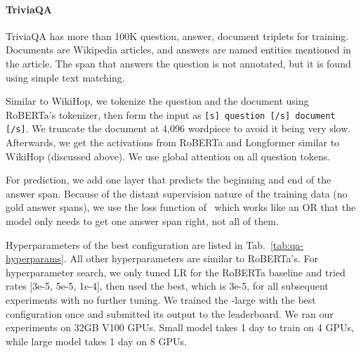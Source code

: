 \paragraph{TriviaQA}
TriviaQA has more than 100K question, answer, document triplets for training. 
Documents are Wikipedia articles, and answers are named entities 
mentioned in the article. The span that answers the question is not annotated, 
but it is found using simple text matching. 

Similar to WikiHop, we tokenize the question and the document 
using RoBERTa's tokenizer, then form the input as \texttt{[s] question [/s] 
document [/s]}. We truncate the document at 4,096 wordpiece to avoid 
it being very slow. Afterwards, we get the activations from RoBERTa 
and Longformer similar to WikiHop (discussed above). 
We use global attention on all question tokens. 

For prediction, we add one layer that predicts the beginning and end of 
the answer span. Because of the distant supervision nature of the training data (no gold answer spans), we use the loss function of~\citet{Clark2017SimpleAE}
which works like an OR that the model only needs to get 
one answer span right, not all of them. 

Hyperparameters of the best configuration are listed in Tab.~\ref{tab:qa-hyperparams}. All other hyperparameters are similar to RoBERTa's. For hyperparameter search, we only tuned LR for the RoBERTa
baseline and tried rates [3e-5, 5e-5, 1e-4], then used the best, which is 3e-5, 
for all subsequent experiments with no further tuning. 
We trained the \model-large with the best configuration once and submitted its 
output to the leaderboard. 
We ran our experiments on 32GB V100 GPUs.
Small model takes 1 day to train on 4 GPUs, while large model takes 
1 day on 8 GPUs. 


